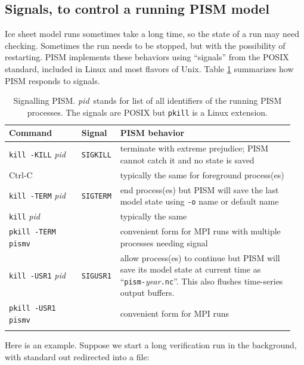 \documentclass[11pt,final]{amsart}
\renewcommand{\t}[1]{\texttt{#1}}
\begin{document}
\subsection{Signals, to control a running PISM model} \label{subsect:signal}    Ice sheet model runs sometimes take a long time, so the state of a run may need checking.  Sometimes the run needs to be stopped, but with the possibility of restarting.  PISM implements these behaviors using ``signals'' from the POSIX standard, included in Linux and most flavors of Unix.  Table \ref{tab:signals} summarizes how PISM responds to signals.

\newcommand\pid{\textsl{pid}}
\newcommand\same{(\textsl{same})}
\begin{table}[ht]
\caption{Signalling PISM.  \pid~stands for list of all identifiers of the running PISM processes.  The signals are POSIX but \t{pkill} is a Linux extension.}\label{tab:signals}
\begin{tabular}{p{0.25\linewidth}p{0.1\linewidth}p{0.6\linewidth}}\hline
\textbf{Command} & \textbf{Signal} & \textbf{PISM behavior} \\
\hline
\texttt{kill -KILL} \pid & \texttt{SIGKILL} & terminate with extreme prejudice; PISM cannot catch it and no state is saved \\
Ctrl-C &  & typically the same for foreground process(es)  \\
\hline
\texttt{kill -TERM} \pid & \texttt{SIGTERM} & end process(es) but PISM will save the last model state using \verb|-o| name or default name \\
\texttt{kill} \pid &  & typically the same \\
\texttt{pkill -TERM pismv} &  & convenient form for MPI runs with multiple processes needing signal \\
\hline
\texttt{kill -USR1} \pid & \texttt{SIGUSR1} & allow process(es) to continue but PISM will save its model state at current time as ``\texttt{pism-}\textsl{year}\texttt{.nc}''. This also flushes time-series output buffers. \\
\texttt{pkill -USR1 pismv} &  & convenient form for MPI runs \\
\hline\normalsize
\end{tabular}
\end{table}

Here is an example.  Suppose we start a long verification run in the background, with standard out redirected into a file:
\end{document}
